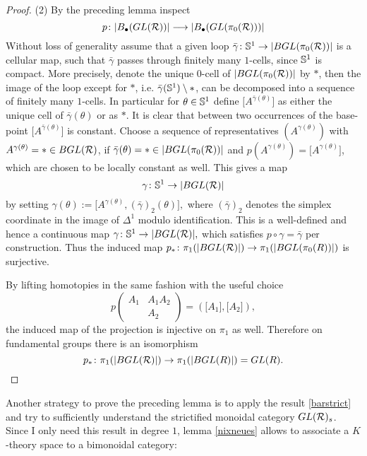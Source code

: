 {\begin{proof}
(2) By the preceding lemma inspect
$$p\colon |B_\bullet(GL(\R))| \longrightarrow |B_\bullet(GL(\pi_0(\R)))|$$
Without loss of generality assume that a given loop $\bar\gamma \colon \S^{1} \rightarrow |BGL(\pi_0(\R))|$ is a cellular map,
such that $\bar\gamma$ passes through finitely many $1$-cells, since $\S^1$ is compact. More precisely, denote
the unique $0$-cell of $|BGL(\pi_0(\R))|$ by $*$, then the image of the loop except for $*$, i.e. $\bar\gamma(\S^1)\setminus *$,
can be decomposed into a sequence of finitely many $1$-cells. In particular for $\theta \in \S^1$ define
$\lbrack A^{\bar\gamma(\theta)}\rbrack$ as either the unique cell of $\bar\gamma(\theta)$ or as $*$.
It is clear that between two occurrences of the base-point $\lbrack A^{\bar\gamma(\theta)}\rbrack$ is constant.
Choose a sequence of representatives $(A^{\gamma(\theta)})$ with $A^{\gamma(\theta)}=*\in BGL(\R)$, if $\bar\gamma(\theta)=* \in |BGL(\pi_0(\R))|$
and $p(A^{\gamma(\theta)}) = \lbrack A^{\gamma(\theta)}\rbrack$, which are chosen to be locally constant as well.
This gives a map
$$\gamma\colon \S^1 \rightarrow |BGL(\R)| $$
by setting $\gamma(\theta):=\lbrack A^{\gamma(\theta)} , (\bar\gamma)_2(\theta)\rbrack,$
where $(\bar\gamma)_2$ denotes the simplex coordinate in the image of $\Delta^1$ modulo identification.
This is a well-defined and hence a continuous map $\gamma\colon \S^1 \rightarrow |BGL(\R)|,$ which satisfies $p\circ \gamma = \bar\gamma$ per construction.
Thus the induced map $p_* \colon \pi_1(|BGL(\R)|) \rightarrow \pi_1(|BGL(\pi_0(R))|)$ is surjective.

By lifting homotopies in the same fashion with the useful choice
$$p\begin{pmatrix}
A_1 & A_1A_2\\ & A_2
\end{pmatrix}=(\lbrack A_1 \rbrack, \lbrack A_2 \rbrack),$$
the induced map of the projection is injective on $\pi_1$ as well. Therefore on fundamental groups there is an isomorphism
$$p_*\colon \pi_1(|BGL(\R)|) \rightarrow \pi_1(|BGL(R)|) = GL(R).$$
\end{proof}}

Another strategy to prove the preceding lemma is to apply the result \ref{barstrict} and try to sufficiently understand the strictified monoidal category $GL(\R)_s$. Since I only need
this result in degree $1$, lemma \ref{nixneues} allows to associate a $K$-theory space to a bimonoidal category:


